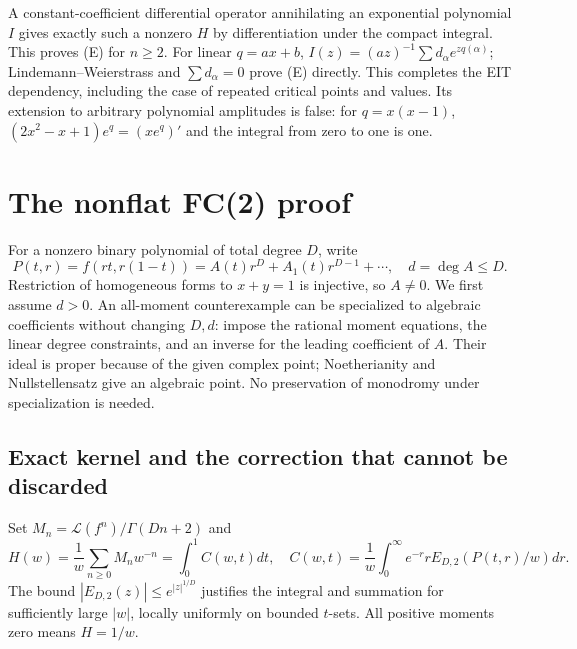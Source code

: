 \documentclass[11pt]{article}
\newcommand{\Lfac}{\mathcal L}
\begin{document}
A constant-coefficient differential operator annihilating an exponential
polynomial $I$ gives exactly such a nonzero $H$ by differentiation under
the compact integral. This proves (E) for $n\ge2$. For linear $q=ax+b$,
$I(z)=(az)^{-1}\sum d_\alpha e^{zq(\alpha)}$; Lindemann--Weierstrass and
$\sum d_\alpha=0$ prove (E) directly. This completes the EIT dependency,
including the case of repeated critical points and values. Its extension
to arbitrary polynomial amplitudes is false: for $q=x(x-1)$,
$(2x^2-x+1)e^q=(xe^q)'$ and the integral from zero to one is one.

\section{The nonflat FC(2) proof}
For a nonzero binary polynomial of total degree $D$, write
\[
 P(t,r)=f(rt,r(1-t))=A(t)r^D+A_1(t)r^{D-1}+\cdots,
 \quad d=\deg A\le D.
\]
Restriction of homogeneous forms to $x+y=1$ is injective, so $A\ne0$.
We first assume $d>0$. An all-moment counterexample can be specialized
to algebraic coefficients without changing $D,d$: impose the rational
moment equations, the linear degree constraints, and an inverse for the
leading coefficient of $A$. Their ideal is proper because of the given
complex point; Noetherianity and Nullstellensatz give an algebraic point.
No preservation of monodromy under specialization is needed.

\subsection{Exact kernel and the correction that cannot be discarded}
Set $M_n=\Lfac(f^n)/\Gamma(Dn+2)$ and
\[
 H(w)=\frac1w\sum_{n\ge0}M_nw^{-n}
 =\int_0^1 C(w,t)dt,
 \quad C(w,t)=\frac1w\int_0^\infty e^{-r}r
       E_{D,2}(P(t,r)/w)dr .                               \tag{10}
\]
The bound $|E_{D,2}(z)|\le e^{|z|^{1/D}}$ justifies the integral and
summation for sufficiently large $|w|$, locally uniformly on bounded
$t$-sets. All positive moments zero means $H=1/w$.
\end{document}
